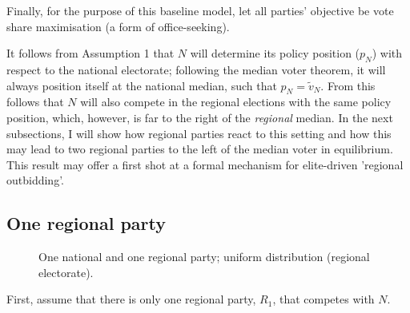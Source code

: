 \documentclass[11pt]{article}
\begin{document}
Finally, for the purpose of this baseline model, let all parties' objective be vote share maximisation (a form of office-seeking).

It follows from Assumption 1 that $N$ will determine its policy position ($p_N$) with respect to the national electorate; following the median voter theorem, it will always position itself at the national median, such that $p_N = \tilde{v}_N$. From this follows that $N$ will also compete in the regional elections with the same policy position, which, however, is far to the right of the \textit{regional} median. In the next subsections, I will show how regional parties react to this setting and how this may lead to two regional parties to the left of the median voter in equilibrium. This result may offer a first shot at a formal mechanism for elite-driven 'regional outbidding'.


\subsection{One regional party}

\begin{figure}[ht]
    \centering 
     \caption{One national and one regional party; uniform distribution (regional electorate).} 
     \label{fig:mod1}
 \end{figure}

 First, assume that there is only one regional party, $R_1$, that competes with $N$. 
\end{document}
